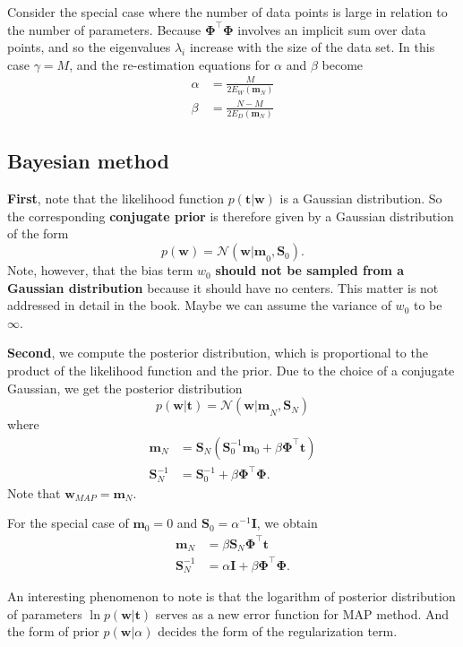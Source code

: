 \documentclass[a4paper]{book}
\renewcommand{\bf}{\mathbf}
\renewcommand{\cal}{\mathcal}
\newcommand{\bs}{\boldsymbol}
\begin{document}
Consider the special case where the number of data points is large in relation to the number of parameters. Because $\bf{\Phi}^{\intercal} \bf{\Phi}$ involves an implicit sum over data points, and so the eigenvalues $\lambda_i$ increase with the size of the data set. In this case $\gamma = M$, and the re-estimation equations for $\alpha$ and $\beta$ become
\begin{align}
	\alpha &= \frac{M}{2 E_W(\bf{m}_N)}\\
	\beta &= \frac{N-M}{2 E_D(\bf{m}_N)}
\end{align}
\subsection{Bayesian method}
\textbf{First}, note that the likelihood function $p(\bf{t}|\bf{w})$ is a Gaussian distribution. So the corresponding \textbf{conjugate prior} is therefore given by a Gaussian distribution of the form
\begin{equation}
	p(\bf{w}) = \cal{N} (\bf{w|m}_0,\bf{S}_0).
\end{equation}
Note, however, that the bias term $w_0$ \textbf{should not be sampled from a Gaussian distribution} because it should have no centers. This matter is not addressed in detail in the book. Maybe we can assume the variance of $w_0$ to be $\infty$.

\textbf{Second}, we compute the posterior distribution, which is proportional to the product of the likelihood function and the prior. Due to the choice of a conjugate Gaussian, we get the posterior distribution
\begin{equation}
	p(\bf{w|t}) = \cal{N}(\bf{w|m}_N,\bf{S}_N)
\end{equation}
where
\begin{align}
	\bf{m}_N &= \bf{S}_N (\bf{S}_0^{-1}\bf{m}_0 + \beta \bf{\Phi}^{\intercal} \bf{t}) \\
	\bf{S}_N^{-1} &= \bf{S}_0^{-1} + \beta \bf{\Phi}^{\intercal} \bf{\Phi}.
\end{align}
Note that $\bf{w}_{MAP} = \bf{m}_N$.

For the special case of $\bf{m}_0 = 0$ and $\bf{S}_0 = \alpha^{-1} \bf{I}$, we obtain
\begin{align}
	\bf{m}_N &= \beta \bf{S}_N \bs{\Phi}^{\intercal} \bf{t} \\
	\bf{S}_N^{-1} &= \alpha \bf{I} + \beta \bs{\Phi}^{\intercal} \bs{\Phi}.
\end{align}

An interesting phenomenon to note is that the logarithm of posterior distribution of parameters $\ln p(\bf{w|t})$ serves as a new error function for MAP method. And the form of prior $p(\bf{w}|\alpha)$ decides the form of the regularization term.
\end{document}
